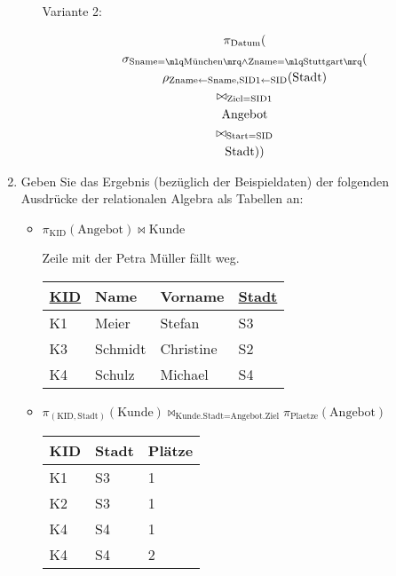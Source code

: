 \documentclass{lehramt-informatik-minimal}
\def\TmpUeber#1{{\setul{-0.9em}{}\ul{#1}}}
\begin{document}
\begin{enumerate}
\begin{itemize}
Variante 2:

\begin{antwort}
\begin{multline*}
\pi_{\text{Datum}}(\\
  \sigma_{
    \text{Sname} = \mlq\text{München}\mrq \land
    \text{Zname} = \mlq\text{Stuttgart}\mrq
  }(\\
    \rho_{
      \text{Zname} \leftarrow \text{Sname},
      \text{SID1} \leftarrow \text{SID}
    }(\text{Stadt})\\
    \bowtie_{\text{Ziel} = \text{SID1}}\\
    \text{Angebot}\\
    \bowtie_{\text{Start} = \text{SID}}\\
    \text{Stadt}
  )
)
\end{multline*}
\end{antwort}

%

\end{itemize}

\item Geben Sie das Ergebnis (bezüglich der Beispieldaten) der folgenden
Ausdrücke der relationalen Algebra als Tabellen an:

%

\begin{itemize}
\item $\pi_{\text{KID}} (\text{Angebot}) \bowtie \text{Kunde}$

\begin{antwort}
Zeile mit der Petra Müller fällt weg.

\begin{tabular}{|l|l|l|l|}
\hline
\ul{KID} & Name & Vorname & \TmpUeber{Stadt}\\\hline\hline
K1 & Meier & Stefan & S3\\\hline
K3 & Schmidt & Christine & S2\\\hline
K4 & Schulz & Michael & S4\\\hline
\end{tabular}
\end{antwort}

%

\item $
\pi_{(\text{KID},\text{Stadt})} (\text{Kunde})
\bowtie_{\text{Kunde.Stadt} = \text{Angebot.Ziel}}
\pi_{\text{Plaetze}} (\text{Angebot})$

\begin{antwort}

\begin{tabular}{|l|l|l|}
\hline
KID & Stadt & Plätze \\\hline\hline
K1 & S3 & 1 \\\hline
K2 & S3 & 1 \\\hline
K4 & S4 & 1 \\\hline
K4 & S4 & 2 \\\hline
\end{tabular}
\end{antwort}
\end{itemize}
\end{enumerate}
\end{document}
